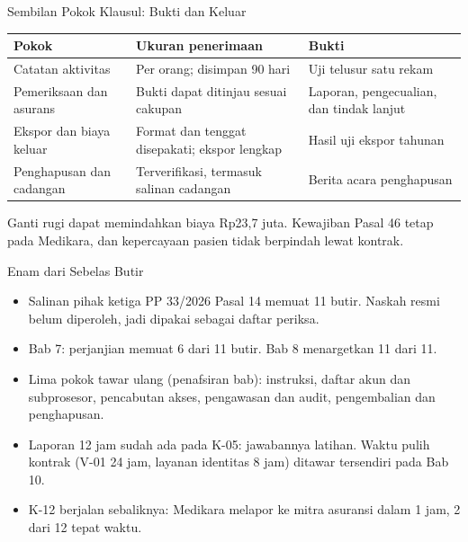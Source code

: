 \documentclass[aspectratio=169, table, 12pt]{beamer}
\begin{document}
\begin{frame}{{\Large Sembilan Pokok Klausul: Bukti dan Keluar}}
  \vspace{2pt}
  \scriptsize
  \begin{tabularx}{\textwidth}{|>{\raggedright\arraybackslash}p{}|>{\raggedright\arraybackslash}X|>{\raggedright\arraybackslash}X|}
    \hline
    \textbf{Pokok} & \textbf{Ukuran penerimaan} & \textbf{Bukti} \\ \hline
    Catatan aktivitas & Per orang; disimpan 90 hari & Uji telusur satu rekam \\ \hline
    Pemeriksaan dan asurans & Bukti dapat ditinjau sesuai cakupan & Laporan, pengecualian, dan
    tindak lanjut \\ \hline
    Ekspor dan biaya keluar & Format dan tenggat disepakati; ekspor lengkap & Hasil uji ekspor
    tahunan \\ \hline
    Penghapusan dan cadangan & Terverifikasi, termasuk salinan cadangan & Berita acara penghapusan
    \\ \hline
  \end{tabularx}

  \vspace{8pt}
  \small Ganti rugi dapat memindahkan biaya Rp23,7 juta. Kewajiban Pasal 46 tetap pada Medikara, dan
  kepercayaan pasien tidak berpindah lewat kontrak.
\end{frame}

\begin{frame}{{\Large Enam dari Sebelas Butir}}
  \vspace{6pt}
  \small
  \begin{itemize}
    \item Salinan pihak ketiga PP 33/2026 Pasal 14 memuat 11 butir. Naskah resmi belum diperoleh,
          jadi dipakai sebagai daftar periksa.
    \item Bab 7: perjanjian memuat 6 dari 11 butir. Bab 8 menargetkan 11 dari 11.
    \item Lima pokok tawar ulang (penafsiran bab): instruksi, daftar akun dan subprosesor,
          pencabutan akses, pengawasan dan audit, pengembalian dan penghapusan.
    \item Laporan 12 jam sudah ada pada K-05: jawabannya latihan. Waktu pulih kontrak (V-01 24 jam,
          layanan identitas 8 jam) ditawar tersendiri pada Bab 10.
    \item K-12 berjalan sebaliknya: Medikara melapor ke mitra asuransi dalam 1 jam, 2 dari 12 tepat
          waktu.
  \end{itemize}
\end{frame}
\end{document}
